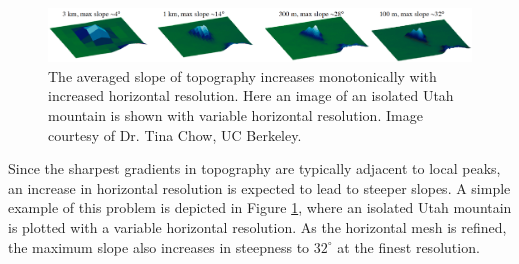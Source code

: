 \documentclass[11pt]{article}
\begin{document}
\begin{figure}[t]
\begin{center}
\includegraphics[width=6.5in]{MountainSlopeResolutionLong.png}
\end{center}
\caption{The averaged slope of topography increases monotonically with increased horizontal resolution.  Here an image of an isolated Utah mountain is shown with variable horizontal resolution.  Image courtesy of Dr. Tina Chow, UC Berkeley.} \label{fig:MountainSlopeResolution}
\end{figure}


Since the sharpest gradients in topography are typically adjacent to local peaks, an increase in horizontal resolution is expected to lead to steeper slopes.  A simple example of this problem is depicted in Figure \ref{fig:MountainSlopeResolution}, where an isolated Utah mountain is plotted with a variable horizontal resolution.  As the horizontal mesh is refined, the maximum slope also increases in steepness to $32^\circ$ at the finest resolution.


\end{document}
